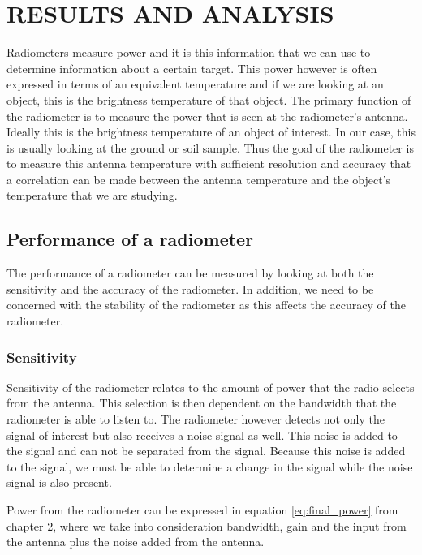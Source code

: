 

\chapter{RESULTS AND ANALYSIS}

Radiometers measure power and it is this information that we can use to determine information about a certain target.  This power however is often expressed in terms of an equivalent temperature and if we are looking at an object, this is the brightness temperature of that object.  The primary function of the radiometer is to measure the power that is seen at the radiometer's antenna.  Ideally this is the brightness temperature of an object of interest.  In our case, this is usually looking at the ground or soil sample.  Thus the goal of the radiometer is to measure this antenna temperature with sufficient resolution and accuracy that a correlation can be made between the antenna temperature and the object's temperature that we are studying.

\section{Performance of a radiometer}
The performance of a radiometer can be measured by looking at both the sensitivity and the accuracy of the radiometer.  In addition, we need to be concerned with the stability of the radiometer as this affects the accuracy of the radiometer.


\subsection{Sensitivity}
Sensitivity of the radiometer relates to the amount of power that the radio selects from the antenna.  This selection is then dependent on the bandwidth that the radiometer is able to listen to.  The radiometer however detects not only the signal of interest but also receives a noise signal as well.  This noise is added to the signal and can not be separated from the signal.  Because this noise is added to the signal, we must be able to determine a change in the signal while the noise signal is also present.  

Power from the radiometer can be expressed in equation \ref{eq:final_power} from chapter 2, where we take into consideration bandwidth, gain and the input from the antenna plus the noise added from the antenna.  

